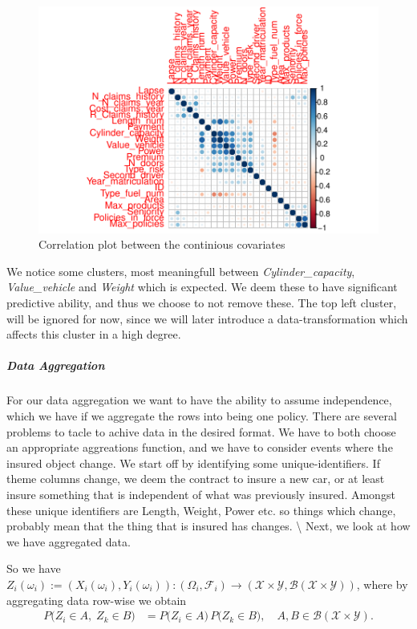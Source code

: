\documentclass[
]{article}
\begin{document}
\begin{figure}

{\centering \includegraphics{assignment_uptodat_files/figure-latex/corplot-1} 

}

\caption{Correlation plot between the continious covariates}\label{fig:corplot}
\end{figure}

We notice some clusters, most meaningfull between
\emph{Cylinder\_capacity}, \emph{Value\_vehicle} and \emph{Weight} which
is expected. We deem these to have significant predictive ability, and
thus we choose to not remove these. The top left cluster, will be
ignored for now, since we will later introduce a data-transformation
which affects this cluster in a high degree.

\subparagraph{Data Aggregation}\label{data-aggregation}

For our data aggregation we want to have the ability to assume
independence, which we have if we aggregate the rows into being one
policy. There are several problems to tacle to achive data in the
desired format. We have to both choose an appropriate aggreations
function, and we have to consider events where the insured object
change. We start off by identifying some unique-identifiers. If theme
columns change, we deem the contract to insure a new car, or at least
insure something that is independent of what was previously insured.
Amongst these unique identifiers are Length, Weight, Power etc. so
things which change, probably mean that the thing that is insured has
changes. \textbackslash{} Next, we look at how we have aggregated data.

So we have
\(Z_i(\omega_i) := (X_i(\omega_i), Y_i(\omega_i)): (\Omega_i, \mathcal{F}_i) \rightarrow ( \mathcal{X} \times \mathcal{Y}, \mathcal{B}(\mathcal{X} \times \mathcal{Y}))\),
where by aggregating data row-wise we obtain \[
\begin{aligned*}
P\bigl(Z_i \in A,\; Z_k \in B\bigr)
&= P\bigl(Z_i \in A\bigr)\,P\bigl(Z_k \in B\bigr), 
\quad A, B \in \mathcal{B}(\mathcal{X}\times\mathcal{Y}).
\end{aligned*}
\]
\end{document}
